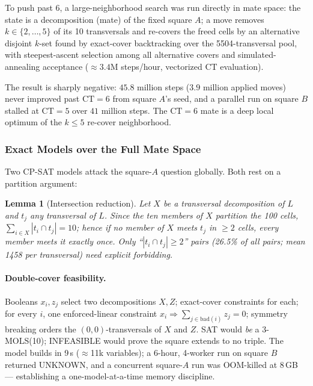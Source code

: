 \documentclass[11pt,a4paper]{article}
\newtheorem{lemma}[theorem]{Lemma}
\theoremstyle{remark}
\newcommand{\CT}{\mathrm{CT}}
\begin{document}
To push past 6, a large-neighborhood search was run directly in mate space:
the state is a decomposition (mate) of the fixed square $A$; a move removes
$k \in \{2,\dots,5\}$ of its 10 transversals and re-covers the freed cells by
an alternative disjoint $k$-set found by exact-cover backtracking over the
5504-transversal pool, with steepest-ascent selection among all alternative
covers and simulated-annealing acceptance ($\approx 3.4$M steps/hour,
vectorized $\CT$ evaluation).

The result is sharply negative: $45.8$ million steps ($3.9$ million applied
moves) never improved past $\CT = 6$ from square $A$'s seed, and a parallel
run on square $B$ stalled at $\CT = 5$ over $41$ million steps. The $\CT = 6$
mate is a deep local optimum of the $k \leq 5$ re-cover neighborhood.

\subsubsection{Exact Models over the Full Mate Space}

Two CP-SAT models attack the square-$A$ question globally. Both rest on a
partition argument:

\begin{lemma}[Intersection reduction]\label{lem:partition}
Let $X$ be a transversal decomposition of $L$ and $t_j$ any transversal of
$L$. Since the ten members of $X$ partition the 100 cells,
$\sum_{i \in X} |t_i \cap t_j| = 10$; hence if no member of $X$ meets $t_j$
in $\geq 2$ cells, every member meets it exactly once. Only
``$|t_i \cap t_j| \geq 2$'' pairs (26.5\% of all pairs; mean 1458 per
transversal) need explicit forbidding.
\end{lemma}

\paragraph{Double-cover feasibility.} Booleans $x_i, z_j$ select two
decompositions $X, Z$; exact-cover constraints for each; for every $i$,
one enforced-linear constraint $x_i \Rightarrow \sum_{j \in \mathrm{bad}(i)} z_j = 0$;
symmetry breaking orders the $(0,0)$-transversals of $X$ and $Z$. SAT would
\emph{be} a 3-MOLS(10); INFEASIBLE would prove the square extends to no
triple. The model builds in 9\,s ($\approx$11k variables); a 6-hour, 4-worker
run on square $B$ returned UNKNOWN, and a concurrent square-$A$ run was
OOM-killed at 8\,GB --- establishing a one-model-at-a-time memory discipline.
\end{document}
